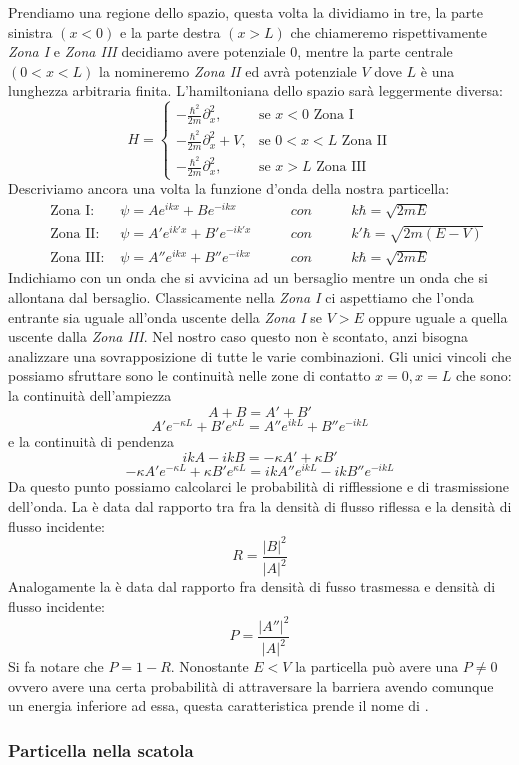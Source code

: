Prendiamo una regione dello spazio, questa volta la dividiamo in tre, la parte sinistra $(x < 0)$ e la parte destra $(x > L)$ che chiameremo rispettivamente \textit{Zona I} e \textit{Zona III} decidiamo avere potenziale $0$, mentre la parte centrale $(0 < x < L)$ la nomineremo \textit{Zona II} ed avrà potenziale $V$ dove $L$ è una lunghezza arbitraria finita. L'hamiltoniana dello spazio sarà leggermente diversa:
$$H=\begin{cases} - \frac{\hbar^2}{2m} \partial_x^2, & \mbox{se } x<0 \mbox{ Zona I} \\
 - \frac{\hbar^2}{2m} \partial_x^2 + V, & \mbox{se } 0<x<L \mbox{ Zona II} \\
 - \frac{\hbar^2}{2m} \partial_x^2, & \mbox{se } x>L \mbox{ Zona III}
\end{cases}$$
Descriviamo ancora una volta la funzione d'onda della nostra particella:
\begin{equation}
\begin{aligned}
  \quad \mbox{Zona I: }   &\psi = Ae^{ikx} + Be^{-ikx} \qquad     & con \qquad & k\hbar = \sqrt{2mE}\\
  \quad \mbox{Zona II: }  &\psi = A'e^{ik'x} + B'e^{-ik'x} \qquad & con \qquad & k'\hbar = \sqrt{2m(E-V)}\\
  \quad \mbox{Zona III: } &\psi = A''e^{ikx} + B''e^{-ikx} \qquad & con \qquad & k\hbar = \sqrt{2mE}
\end{aligned}
\end{equation}
Indichiamo con  un onda che si avvicina ad un bersaglio mentre  un onda che si allontana dal bersaglio. Classicamente nella \textit{Zona I} ci aspettiamo che l'onda entrante sia uguale all'onda uscente della \textit{Zona I} se $V > E$ oppure uguale a quella uscente dalla \textit{Zona III}. Nel nostro caso questo non è scontato, anzi bisogna analizzare una sovrapposizione di tutte le varie combinazioni. Gli unici vincoli che possiamo sfruttare sono le continuità nelle zone di contatto $ x = 0, x = L$ che sono: la continuità dell'ampiezza
$$A + B = A' + B'$$
$$A'e^{-\kappa L} + B'e^{\kappa L} = A''e^{ikL} + B''e^{-ikL}$$
e la continuità di pendenza
$$ikA - ikB = -\kappa A' + \kappa B'$$
$$-\kappa A'e^{-\kappa L} + \kappa B'e^{\kappa L} = ikA''e^{ikL} - ikB''e^{-ikL}$$
Da questo punto possiamo calcolarci le probabilità di rifflessione e di trasmissione dell'onda.
La  è data dal rapporto tra fra la densità di flusso riflessa e la densità di flusso incidente:
$$R = \frac{|B|^2}{|A|^2}$$
Analogamente la  è data dal rapporto fra densità di fusso trasmessa e densità di flusso incidente:
$$P = \frac{|A''|^2}{|A|^2}$$
Si fa notare che $P = 1 - R$. Nonostante $E < V$ la particella può avere una $P \ne 0$ ovvero avere una certa probabilità di attraversare la barriera avendo comunque un energia inferiore ad essa, questa caratteristica prende il nome di .

\subsubsection{Particella nella scatola}
